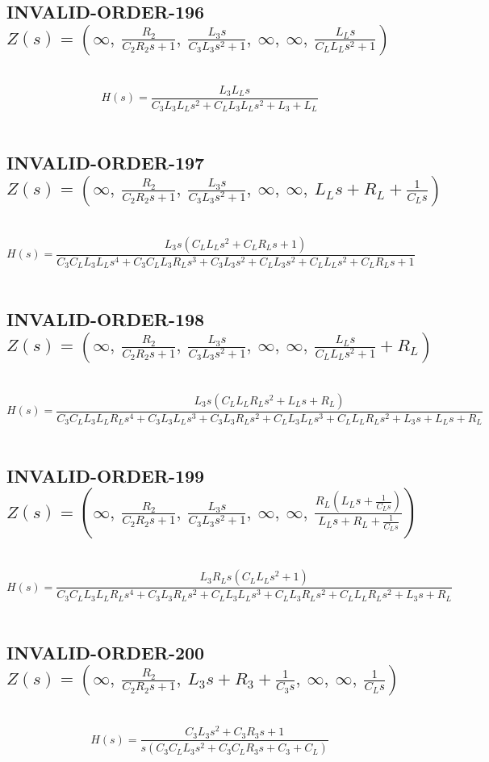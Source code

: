 \documentclass{article}
\begin{document}
\subsection{INVALID-ORDER-196 $Z(s) = \left( \infty, \  \frac{R_{2}}{C_{2} R_{2} s + 1}, \  \frac{L_{3} s}{C_{3} L_{3} s^{2} + 1}, \  \infty, \  \infty, \  \frac{L_{L} s}{C_{L} L_{L} s^{2} + 1}\right)$ } \ 
\textbf{\[H(s) = \frac{L_{3} L_{L} s}{C_{3} L_{3} L_{L} s^{2} + C_{L} L_{3} L_{L} s^{2} + L_{3} + L_{L}}\] } \ 
\subsection{INVALID-ORDER-197 $Z(s) = \left( \infty, \  \frac{R_{2}}{C_{2} R_{2} s + 1}, \  \frac{L_{3} s}{C_{3} L_{3} s^{2} + 1}, \  \infty, \  \infty, \  L_{L} s + R_{L} + \frac{1}{C_{L} s}\right)$ } \ 
\textbf{\[H(s) = \frac{L_{3} s \left(C_{L} L_{L} s^{2} + C_{L} R_{L} s + 1\right)}{C_{3} C_{L} L_{3} L_{L} s^{4} + C_{3} C_{L} L_{3} R_{L} s^{3} + C_{3} L_{3} s^{2} + C_{L} L_{3} s^{2} + C_{L} L_{L} s^{2} + C_{L} R_{L} s + 1}\] } \ 
\subsection{INVALID-ORDER-198 $Z(s) = \left( \infty, \  \frac{R_{2}}{C_{2} R_{2} s + 1}, \  \frac{L_{3} s}{C_{3} L_{3} s^{2} + 1}, \  \infty, \  \infty, \  \frac{L_{L} s}{C_{L} L_{L} s^{2} + 1} + R_{L}\right)$ } \ 
\textbf{\[H(s) = \frac{L_{3} s \left(C_{L} L_{L} R_{L} s^{2} + L_{L} s + R_{L}\right)}{C_{3} C_{L} L_{3} L_{L} R_{L} s^{4} + C_{3} L_{3} L_{L} s^{3} + C_{3} L_{3} R_{L} s^{2} + C_{L} L_{3} L_{L} s^{3} + C_{L} L_{L} R_{L} s^{2} + L_{3} s + L_{L} s + R_{L}}\] } \ 
\subsection{INVALID-ORDER-199 $Z(s) = \left( \infty, \  \frac{R_{2}}{C_{2} R_{2} s + 1}, \  \frac{L_{3} s}{C_{3} L_{3} s^{2} + 1}, \  \infty, \  \infty, \  \frac{R_{L} \left(L_{L} s + \frac{1}{C_{L} s}\right)}{L_{L} s + R_{L} + \frac{1}{C_{L} s}}\right)$ } \ 
\textbf{\[H(s) = \frac{L_{3} R_{L} s \left(C_{L} L_{L} s^{2} + 1\right)}{C_{3} C_{L} L_{3} L_{L} R_{L} s^{4} + C_{3} L_{3} R_{L} s^{2} + C_{L} L_{3} L_{L} s^{3} + C_{L} L_{3} R_{L} s^{2} + C_{L} L_{L} R_{L} s^{2} + L_{3} s + R_{L}}\] } \ 
\subsection{INVALID-ORDER-200 $Z(s) = \left( \infty, \  \frac{R_{2}}{C_{2} R_{2} s + 1}, \  L_{3} s + R_{3} + \frac{1}{C_{3} s}, \  \infty, \  \infty, \  \frac{1}{C_{L} s}\right)$ } \ 
\textbf{\[H(s) = \frac{C_{3} L_{3} s^{2} + C_{3} R_{3} s + 1}{s \left(C_{3} C_{L} L_{3} s^{2} + C_{3} C_{L} R_{3} s + C_{3} + C_{L}\right)}\] } \ 
\end{document}
